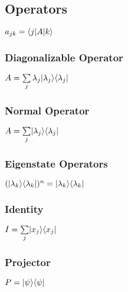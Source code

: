\subsection{Operators}			
\begin{itemize}
\itemt \( a_{jk} = \langle j\rvert A \lvert k\rangle \)
\end{itemize}			

\subsubsection{Diagonalizable Operator}			
\begin{itemize}
\itemt \( A = \sum\limits_{j} \lambda_j \lvert\lambda_j\rangle \langle\lambda_j\rvert \)
\end{itemize}

\subsubsection{Normal Operator}			
\begin{itemize}
\itemt \( A =\sum\limits_{j} \lvert\lambda_j\rangle \langle\lambda_j\rvert \)
\end{itemize}

\subsubsection{Eigenstate Operators}			
\begin{itemize}
\itemt \( (\lvert\lambda_k\rangle\langle\lambda_k\rvert)^n = \lvert\lambda_k\rangle\langle\lambda_k\rvert \)
\end{itemize}

\subsubsection{Identity}
\begin{itemize}
\itemt \( I = \sum\limits_{j} \lvert x_j\rangle \langle x_j\rvert \)
\end{itemize}

\subsubsection{Projector}
\begin{itemize}
\itemt \( P = \lvert\psi\rangle \langle\psi\rvert \)
\end{itemize}				

